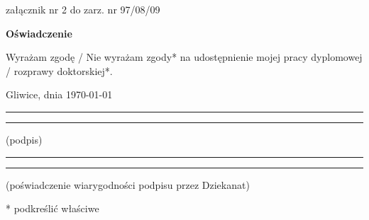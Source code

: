 
\cleardoublepage

\begin{flushright}
	załącznik nr 2 do zarz. nr 97/08/09
\end{flushright}

\vfill

\begin{center}
	\Large\bfseries Oświadczenie
\end{center}

\vfill

Wyrażam  zgodę / Nie wyrażam zgody*  na  udostępnienie  mojej  pracy  dyplomowej / rozprawy doktorskiej*.

\vfill

Gliwice, dnia \today

\vfill

\rule{0.5\textwidth}{0cm}\dotfill

\rule{0.5\textwidth}{0cm}
\begin{minipage}{0.45\textwidth}
	{\begin{center}(podpis)\end{center}}
\end{minipage}

\vfill

\rule{0.5\textwidth}{0cm}\dotfill

\rule{0.5\textwidth}{0cm}
\begin{minipage}{0.45\textwidth}
	{\begin{center}\rule{0mm}{5mm}(poświadczenie wiarygodności podpisu przez Dziekanat)\end{center}}
\end{minipage}


\vfill

* podkreślić właściwe
